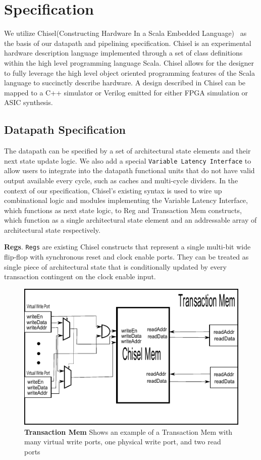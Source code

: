 \section{Specification}
We utilize Chisel(Constructing Hardware In a Scala Embedded
Language)~\cite{Bachrach:2012} as the basis of our datapath and
pipelining specification. Chisel is an experimental hardware
description language implemented through a set of class definitions
within the high level programming language Scala. Chisel allows for
the designer to fully leverage the high level object oriented
programming features of the Scala language to succinctly describe
hardware. A design described in Chisel can be mapped to a C++
simulator or Verilog emitted for either FPGA simulation or ASIC
synthesis.

\subsection{Datapath Specification}
The datapath can be specified by a set of architectural state elements
and their next state update logic. We also add a special {\tt Variable
Latency Interface} to allow users to integrate into the datapath
functional units that do not have valid output available every cycle,
such as caches and multi-cycle dividers. In the context of our
specification, Chisel's existing syntax is used to wire up
combinational logic and modules implementing the Variable Latency
Interface, which functions as next state logic, to Reg and Transaction
Mem constructs, which function as a single architectural state element
and an addressable array of architectural state respectively.

{\bf Regs}. {\tt Regs} are existing Chisel constructs that represent a
single multi-bit wide flip-flop with synchronous reset and clock
enable ports. They can be treated as single piece of architectural
state that is conditionally updated by every transaction contingent on
the clock enable input.

\begin{figure}[htb]
\centering
\includegraphics{figures/TMEM.pdf}
\caption{{\bf Transaction Mem} Shows an example of a Transaction Mem with many virtual write ports, one physical write port, and two read ports}
\label{fig:CPI}
\end{figure}

